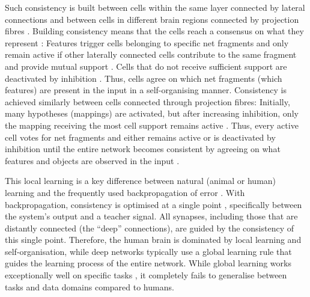 Such consistency is built between cells within the same layer connected by lateral connections  and between cells in different brain regions connected by projection fibres \cite{greig_molecular_2013, liang_interactions_2017}.
Building consistency means that the cells reach a consensus on what they represent \cite{von_der_malsburg_theory_2022}: Features trigger cells belonging to specific net fragments and only remain active if other laterally connected cells contribute to the same fragment and provide mutual support . Cells that do not receive sufficient support are deactivated by inhibition .
Thus, cells agree on which net fragments (which features) are present in the input in a self-organising manner.
Consistency is achieved similarly between cells connected through projection fibres: Initially, many hypotheses (mappings) are activated, but after increasing inhibition, only the mapping receiving the most cell support remains active \cite{vogels_inhibitory_2011, von_der_malsburg_theory_2022}.
Thus, every active cell votes for net fragments and either remains active or is deactivated by inhibition until the entire network becomes consistent by agreeing on what features and objects are observed in the input \cite{von_der_malsburg_concerning_2018, von_der_malsburg_theory_2022}.

This local learning is a key difference between natural (animal or human) learning and the frequently used backpropagation of error \cite{rosenblatt_principles_1962, linnainmaa_taylor_1976}. With backpropagation, consistency is optimised at a single point \cite{crick_recent_1989, wang_comprehensive_2022}, specifically between the system's output and a teacher signal. All synapses, including those that are distantly connected (the ``deep'' connections), are guided by the consistency of this single point. Therefore, the human brain is dominated by local learning and self-organisation, while deep networks typically use a global learning rule that guides the learning process of the entire network.
While global learning works exceptionally well on specific tasks \cite{bertolini_machine_2021}, it completely fails to generalise between tasks and data domains compared to humans.

